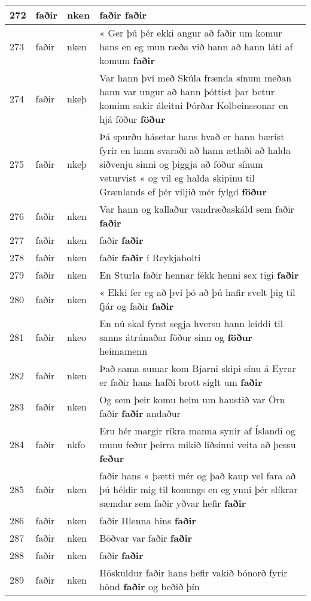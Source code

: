 \documentclass{article}
\begin{document}
\begin{longtable}{p{1cm}|p{1cm}|p{1cm}|p{13cm}}
\hline
272&faðir&nken&faðir \textbf{faðir} \\
\hline
273&faðir&nken&« Ger þú þér ekki angur að faðir um komur hans en eg mun ræða við hann að hann láti af komum \textbf{faðir} \\
\hline
274&faðir&nkeþ&Var hann því með Skúla frænda sínum meðan hann var ungur að hann þóttist þar betur kominn sakir áleitni Þórðar Kolbeinssonar en hjá föður \textbf{föður} \\
\hline
275&faðir&nkeþ&Þá spurðu hásetar hans hvað er hann bærist fyrir en hann svaraði að hann ætlaði að halda siðvenju sinni og þiggja að föður sínum veturvist « og vil eg halda skipinu til Grænlands ef þér viljið mér fylgd \textbf{föður} \\
\hline
276&faðir&nken&Var hann og kallaður vandræðaskáld sem faðir \textbf{faðir} \\
\hline
277&faðir&nken&faðir \textbf{faðir} \\
\hline
278&faðir&nken&faðir \textbf{faðir} í Reykjaholti\\
\hline
279&faðir&nken&En Sturla faðir hennar fékk henni sex tigi \textbf{faðir} \\
\hline
280&faðir&nken&« Ekki fer eg að því þó að þú hafir svelt þig til fjár og faðir \textbf{faðir} \\
\hline
281&faðir&nkeo&En nú skal fyrst segja hversu hann leiddi til sanns átrúnaðar föður sinn og \textbf{föður} heimamenn\\
\hline
282&faðir&nken&Það sama sumar kom Bjarni skipi sínu á Eyrar er faðir hans hafði brott siglt um \textbf{faðir} \\
\hline
283&faðir&nken&Og sem þeir komu heim um haustið var Örn faðir \textbf{faðir} andaður\\
\hline
284&faðir&nkfo&Eru hér margir ríkra manna synir af Íslandi og munu feður þeirra mikið liðsinni veita að þessu \textbf{feður} \\
\hline
285&faðir&nken&faðir hans « þætti mér og það kaup vel fara að þú héldir mig til konungs en eg ynni þér slíkrar sæmdar sem faðir yðvar hefir \textbf{faðir} \\
\hline
286&faðir&nken&faðir Hlenna hins \textbf{faðir} \\
\hline
287&faðir&nken&Böðvar var faðir \textbf{faðir} \\
\hline
288&faðir&nken&faðir \textbf{faðir} \\
\hline
289&faðir&nken&Höskuldur faðir hans hefir vakið bónorð fyrir hönd \textbf{faðir} og beðið þín\\

\end{longtable}
\end{document}
